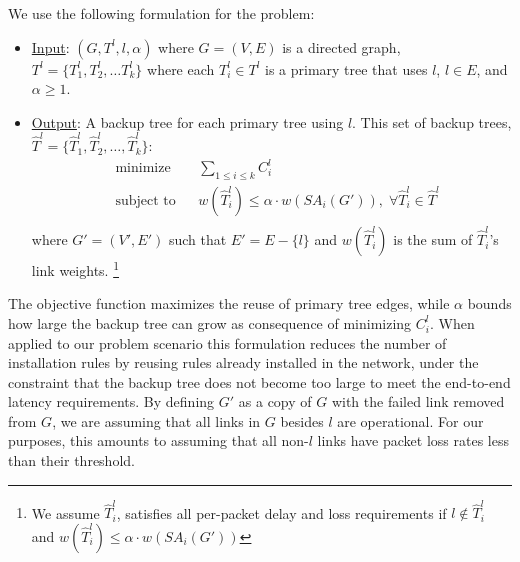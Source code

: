 We use the following formulation for the \mc problem: 
\begin{itemize}

	\item  \underline{Input}: $(G,T^l,l,\alpha)$ where $G=(V,E)$ is a directed graph, $T^l=\{T_1^l,T_2^l, \dots T_k^l\}$ where each $T_i^l \in T^l$ is a primary tree that uses $l$, 
	$l \in E$, and $\alpha \geq 1$. 


	\item \underline{Output}: A backup tree for each primary tree using $l$. This set of backup trees, $\hat{T}^l = \{\hat{T}^l_1,\hat{T}^l_2,\dots,\hat{T}^l_k\}$:
		\begin{equation}
		\label{eqn:mc-obj-function}
		\begin{aligned}
			& {\text{minimize}}
			& & \sum_{1 \leq i \leq k} C^l_i \\
			& \text{subject to}
			& & w(\hat{T}^l_i) \leq \alpha \cdot w(SA_i(G')), \;  \forall \hat{T}^l_i \in \hat{T}^l \\
		\end{aligned}
		\end{equation}
		where $G'=(V',E')$ such that $E' = E - \{l\}$ and $w(\hat{T}^l_i)$ is the sum of $\hat{T}^l_i$'s link weights.	
		\footnote{We assume $\hat{T}^l_i$, satisfies all per-packet delay and loss requirements if $l \notin \hat{T}^l_i$ and $w(\hat{T}^l_i) \leq \alpha \cdot w(SA_i(G'))$}

\end{itemize}   %
The objective function maximizes the reuse of primary tree edges, while $\alpha$ bounds how large the backup tree can grow as consequence of minimizing $C^l_i$.  When applied to our
problem scenario this formulation reduces the number of installation rules by reusing rules already installed in the network, under the constraint that the 
backup tree does not become too large to meet the end-to-end latency requirements. 
By defining $G'$ as a copy of $G$ with the failed link removed from $G$, we are assuming that all links in $G$ besides $l$ are operational.  For
our purposes, this amounts to assuming that all non-$l$ links have packet loss rates less than their threshold. %

